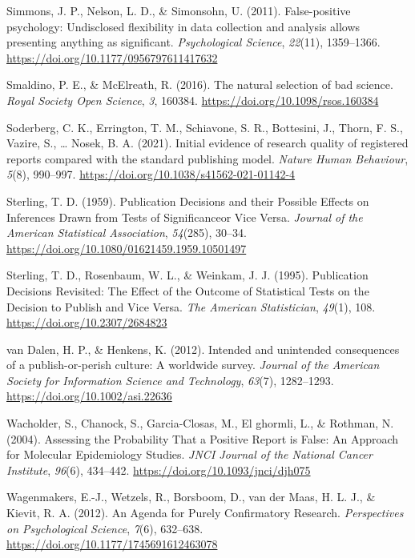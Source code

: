\documentclass[british,,man,mask,floatsintext]{apa6}
\begin{document}
\leavevmode\hypertarget{ref-Simmons2011}{}%
Simmons, J. P., Nelson, L. D., \& Simonsohn, U. (2011). False-positive psychology: Undisclosed flexibility in data collection and analysis allows presenting anything as significant. \emph{Psychological Science}, \emph{22}(11), 1359--1366. \url{https://doi.org/10.1177/0956797611417632}

\leavevmode\hypertarget{ref-Smaldino2016}{}%
Smaldino, P. E., \& McElreath, R. (2016). The natural selection of bad science. \emph{Royal Society Open Science}, \emph{3}, 160384. \url{https://doi.org/10.1098/rsos.160384}

\leavevmode\hypertarget{ref-Soderberg2021}{}%
Soderberg, C. K., Errington, T. M., Schiavone, S. R., Bottesini, J., Thorn, F. S., Vazire, S., \ldots{} Nosek, B. A. (2021). Initial evidence of research quality of registered reports compared with the standard publishing model. \emph{Nature Human Behaviour}, \emph{5}(8), 990--997. \url{https://doi.org/10.1038/s41562-021-01142-4}

\leavevmode\hypertarget{ref-Sterling1959}{}%
Sterling, T. D. (1959). Publication Decisions and their Possible Effects on Inferences Drawn from Tests of Significanceor Vice Versa. \emph{Journal of the American Statistical Association}, \emph{54}(285), 30--34. \url{https://doi.org/10.1080/01621459.1959.10501497}

\leavevmode\hypertarget{ref-Sterling1995}{}%
Sterling, T. D., Rosenbaum, W. L., \& Weinkam, J. J. (1995). Publication Decisions Revisited: The Effect of the Outcome of Statistical Tests on the Decision to Publish and Vice Versa. \emph{The American Statistician}, \emph{49}(1), 108. \url{https://doi.org/10.2307/2684823}

\leavevmode\hypertarget{ref-vanDalen2012}{}%
van Dalen, H. P., \& Henkens, K. (2012). Intended and unintended consequences of a publish-or-perish culture: A worldwide survey. \emph{Journal of the American Society for Information Science and Technology}, \emph{63}(7), 1282--1293. \url{https://doi.org/10.1002/asi.22636}

\leavevmode\hypertarget{ref-Wacholder2004}{}%
Wacholder, S., Chanock, S., Garcia-Closas, M., El ghormli, L., \& Rothman, N. (2004). Assessing the Probability That a Positive Report is False: An Approach for Molecular Epidemiology Studies. \emph{JNCI Journal of the National Cancer Institute}, \emph{96}(6), 434--442. \url{https://doi.org/10.1093/jnci/djh075}

\leavevmode\hypertarget{ref-Wagenmakers2012}{}%
Wagenmakers, E.-J., Wetzels, R., Borsboom, D., van der Maas, H. L. J., \& Kievit, R. A. (2012). An Agenda for Purely Confirmatory Research. \emph{Perspectives on Psychological Science}, \emph{7}(6), 632--638. \url{https://doi.org/10.1177/1745691612463078}
\end{document}
